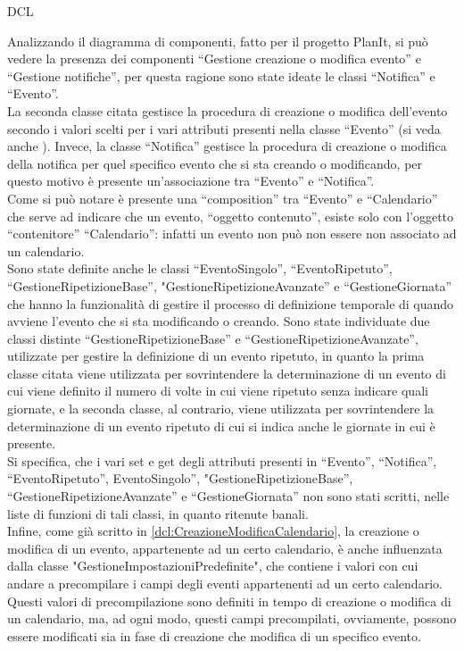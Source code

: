 \begin{listaPersonale}{DCL}
\begin{listaPersonale2}[DCL]{}


        Analizzando il diagramma di componenti, fatto per il progetto PlanIt, si può vedere la presenza dei componenti “Gestione creazione o modifica evento” e “Gestione notifiche”, per questa ragione sono state ideate le classi “Notifica” e “Evento”. \\
        La seconda classe citata gestisce la procedura di creazione o modifica dell'evento secondo i valori scelti per i vari attributi presenti nella classe “Evento” (si veda anche ). Invece, la classe “Notifica” gestisce la procedura di creazione o modifica della notifica per quel specifico evento che si sta creando o modificando, per questo motivo è presente un'associazione tra “Evento” e “Notifica”.\\
        Come si può notare è presente una “composition” tra “Evento” e “Calendario” che serve ad indicare che un evento, “oggetto contenuto”, esiste solo con l'oggetto “contenitore” “Calendario”: infatti un evento non può non essere non associato ad un calendario.\\
        Sono state definite anche le classi “EventoSingolo”, “EventoRipetuto”, “GestioneRipetizioneBase”, "GestioneRipetizioneAvanzate” e “GestioneGiornata” che hanno la funzionalità di gestire il processo di definizione temporale di quando avviene l'evento che si sta modificando o creando. Sono state individuate due classi distinte “GestioneRipetizioneBase” e “GestioneRipetizioneAvanzate”, utilizzate per gestire la definizione di un evento ripetuto, in quanto la prima classe citata viene utilizzata per sovrintendere la determinazione di un evento di cui viene definito il numero di volte in cui viene ripetuto senza indicare quali giornate, e la seconda classe, al contrario, viene utilizzata per sovrintendere la determinazione di un evento ripetuto di cui si indica anche le giornate in cui è presente. \\
        Si specifica, che i vari set e get degli attributi presenti in “Evento”, “Notifica”, “EventoRipetuto”, EventoSingolo”, "GestioneRipetizioneBase”, “GestioneRipetizioneAvanzate” e “GestioneGiornata” non sono stati scritti, nelle liste di funzioni di tali classi, in quanto ritenute banali. \\
        Infine, come già scritto in \ref{dcl:CreazioneModificaCalendario}, la creazione o modifica di un evento, appartenente ad un certo calendario, è anche influenzata dalla classe "GestioneImpostazioniPredefinite", che contiene i valori con cui andare a precompilare i campi degli eventi appartenenti ad un certo calendario. Questi valori di precompilazione sono definiti in tempo di creazione o modifica di un calendario, ma, ad ogni modo, questi campi precompilati, ovviamente, possono essere modificati sia in fase di creazione che modifica di un specifico evento.



\end{listaPersonale2}
\end{listaPersonale}

